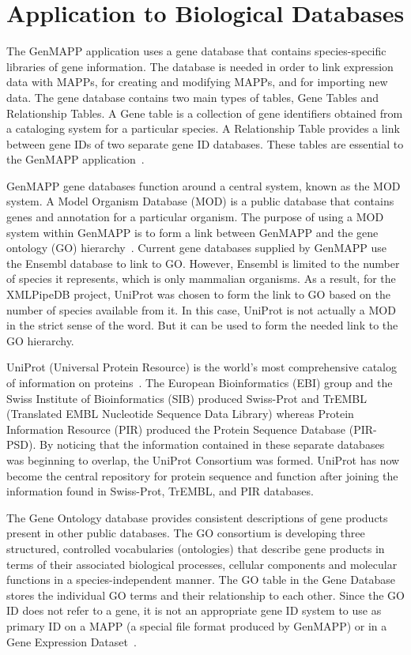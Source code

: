 \section{Application to Biological Databases}
\label{biodb}
The GenMAPP application uses a gene database that contains species-specific
libraries of gene information.  The database is needed in order to link expression
data with MAPPs, for creating and modifying MAPPs, and for importing new data.
The gene database contains two main types of tables, Gene Tables and Relationship
Tables.  A Gene table is a collection of gene identifiers obtained from a
cataloging system for a particular species.  A Relationship Table provides a link
between gene IDs of two separate gene ID databases.  These tables are essential to
the GenMAPP application~\cite{noSupport}.

GenMAPP gene databases function around a central system, known as the MOD system.
A Model Organism Database (MOD) is a public database that contains genes and
annotation for a particular organism.
The purpose of using a MOD system within GenMAPP is to form a link between
GenMAPP and the gene ontology (GO) hierarchy~\cite{noSupport}.  Current gene
databases supplied by GenMAPP use the Ensembl database to link to GO.  However,
Ensembl is limited to the number of species it represents, which is only
mammalian organisms.
As a result, for the XMLPipeDB project, UniProt was chosen to form the link to GO
based on the number of species available from it.  In this case, UniProt is not
actually a MOD in the strict sense of the word.  But it can be used to form the
needed link to the GO hierarchy.

UniProt (Universal Protein Resource) is the world's most comprehensive catalog of
information on proteins~\cite{uniprotWeb}.
The European Bioinformatics (EBI) group and the
Swiss Institute of Bioinformatics (SIB) produced Swiss-Prot and TrEMBL
(Translated EMBL Nucleotide Sequence Data Library)
whereas
Protein Information Resource (PIR) produced the Protein Sequence Database (PIR-PSD).
By noticing that the information contained in these separate databases was beginning
to overlap, the UniProt Consortium was formed.
UniProt has now become the central repository
for protein sequence and function after joining the information found in
Swiss-Prot, TrEMBL, and PIR databases.

The Gene Ontology database provides consistent descriptions of gene products present
in other public databases. The GO consortium is developing three structured, controlled
vocabularies (ontologies) that describe gene products in
terms of their associated biological processes, cellular components and molecular functions
in a species-independent manner. The GO table in the Gene Database stores the individual
GO terms and their relationship to each other. Since the GO ID does not refer to a gene,
it is not an appropriate gene ID system to use as primary ID on a MAPP 
(a special file format produced by GenMAPP) or in a Gene Expression Dataset~\cite{genmapp.com}.
